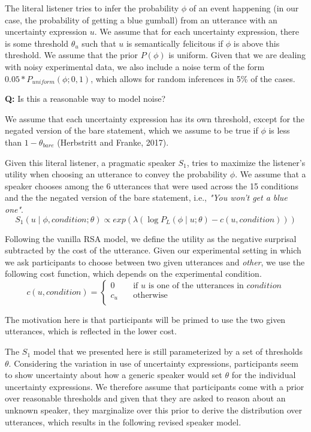 \documentclass[lucida,biblatex]{sp} %
\begin{document}
The literal listener tries to infer the probability $\phi$ of an event happening (in our case, the probability of getting a blue gumball) from an utterance with an uncertainty expression $u$. We assume that for each uncertainty expression, there is some threshold $\theta_u$ such that $u$ is semantically felicitous if  $\phi$ is above this threshold. We assume that the prior $P(\phi)$ is uniform. Given that we are dealing with noisy experimental data, we also include a noise term of the form $0.05 * P_{uniform}(\phi; 0,1)$, which allows for random inferences in 5\% of the cases. 

\vspace{1em}

\textbf{Q:} Is this a reasonable way to model noise?

\vspace{1em}


We assume that each uncertainty expression has its own threshold, except for the negated version of the bare statement, which we assume to be true if $\phi$ is less than $1-\theta_{bare}$ (Herbstritt and Franke, 2017).

Given this literal listener, a pragmatic speaker $S_1$, tries to maximize the listener's utility when choosing an utterance to convey the probability $\phi$. We assume that a speaker chooses among the 6 utterances that were used across the 15 conditions and the the negated version of the bare statement, i.e., \textit{"You won't get a blue one"}.
$$S_1( u \mid \phi, condition; \theta ) \propto exp \left(\lambda \left( \log P_L(\phi \mid u; \theta) - c(u, condition) \right) \right) $$

Following the vanilla RSA model, we define the utility as the negative surprisal subtracted by the cost of the utterance. Given our experimental setting in which we ask participants to choose between two given utterances and \textit{other}, we use the following cost function, which depends on the experimental condition.
$$
c(u, condition) = 
     \begin{cases}
       0 &\quad\text{if } u  \text{ is one of the utterances in } condition\\
       c_{u} &\quad\text{otherwise} \\
     \end{cases}
$$

The motivation here is that participants will be primed to use the two given utterances, which is reflected in the lower cost.

The $S_1$ model that we presented here is still parameterized by a set of thresholds $\theta$. Considering the variation in use of uncertainty expressions, participants seem to show uncertainty about how a generic speaker would set $\theta$ for the individual uncertainty expressions. We therefore assume that participants come with a prior over reasonable thresholds and given that they are asked to reason about an unknown speaker, they marginalize over this prior to derive the distribution over utterances, which results in the following revised speaker model.
\end{document}
